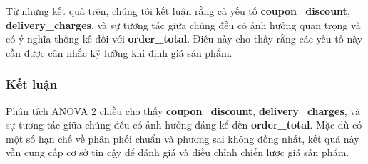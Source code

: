  Từ những kết quả trên, chúng tôi kết luận rằng cả yếu tố \textbf{coupon\_discount}, \textbf{delivery\_charges}, và sự tương tác giữa chúng đều có ảnh hưởng quan trọng và có ý nghĩa thống kê đối với \textbf{order\_total}. Điều này cho thấy rằng các yếu tố này cần được cân nhắc kỹ lưỡng khi định giá sản phẩm.
               
        
\subsubsection{Kết luận}
Phân tích ANOVA 2 chiều cho thấy \textbf{coupon\_discount}, \textbf{delivery\_charges}, và sự tương tác giữa chúng đều có ảnh hưởng đáng kể đến \textbf{order\_total}. Mặc dù có một số hạn chế về phân phối chuẩn và phương sai không đồng nhất, kết quả này vẫn cung cấp cơ sở tin cậy để đánh giá và điều chỉnh chiến lược giá sản phẩm.
